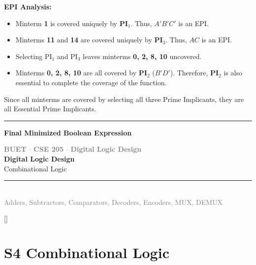 \documentclass[12pt,a3paper]{article}
\newcommand{\secdivider}[4]{%
  \newpage\thispagestyle{empty}%
  \vspace*{\fill}%
  \begin{tcolorbox}[enhanced,colback=#4!7,colframe=#3,boxrule=1.5pt,arc=8pt,
    left=20pt,right=20pt,top=22pt,bottom=22pt,
    shadow={3pt}{-3pt}{0pt}{black!15}]
    \centering
    {\large\textcolor{gray}{\textbf{BUET $\cdot$ CSE 205 $\cdot$ Digital Logic Design}}}\\[8pt]
    {\fontsize{26}{32}\selectfont\bfseries\textcolor{#3}{Digital Logic Design}}\\[6pt]
    {\fontsize{15}{19}\selectfont\textcolor{dgray}{#1}}\\[12pt]
    \textcolor{#3!60}{\rule{0.5\textwidth}{0.5pt}}\\[6pt]
    {\small\textcolor{gray}{#2}}
  \end{tcolorbox}%
  \vspace*{\fill}\newpage%
}
\begin{document}
\begin{enumerate}
\begin{tcolorbox}[enhanced,breakable,ansbox,colback=cC!4,colframe=cC,boxrule=0.8pt,arc=5pt,title={\textbf{Answer}},fonttitle=\bfseries\color{white},colbacktitle=cC]
\textbf{EPI Analysis:}
\begin{itemize}
    \item Minterm \textbf{1} is covered uniquely by \textbf{PI$_1$}. Thus, $A'B'C'$ is an EPI.
    \item Minterms \textbf{11} and \textbf{14} are covered uniquely by \textbf{PI$_3$}. Thus, $AC$ is an EPI.
    \item Selecting PI$_1$ and PI$_3$ leaves minterms \textbf{0, 2, 8, 10} uncovered.
    \item Minterms \textbf{0, 2, 8, 10} are all covered by \textbf{PI$_2$} ($B'D'$). Therefore, \textbf{PI$_2$} is also essential to complete the coverage of the function.
\end{itemize}

Since all minterms are covered by selecting all three Prime Implicants, they are all Essential Prime Implicants.

\vspace{1.5em}
\rule{\textwidth}{0.4pt}
\vspace{1em}

\textbf{\large Final Minimized Boolean Expression}

\begin{center}
\end{center}

\end{tcolorbox}

\end{enumerate}





\secdivider{Combinational Logic}{Adders, Subtractors, Comparators, Decoders, Encoders, MUX, DEMUX}{cD}{violet}

\label{sec:S4}
\titleformat{\section}{\large\bfseries\color{cD}}{}{0em}{}[\titlerule]
\section*{S4 \quad Combinational Logic}
\end{document}
